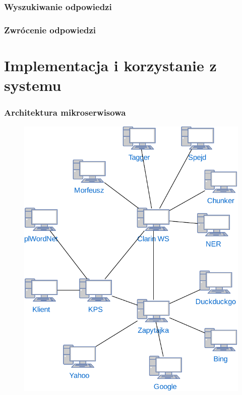 \documentclass{beamer}
\begin{document}
\begin{frame}
  \frametitle{Wyszukiwanie odpowiedzi}

\end{frame}

\begin{frame}
  \frametitle{Zwrócenie odpowiedzi}

\end{frame}

\section{Implementacja i korzystanie z systemu}
\begin{frame}
  \frametitle{Architektura mikroserwisowa}
  \begin{figure}
    \centering
    \includegraphics[width=0.5\columnwidth]{figures/WEDT-Uslugi.pdf}
    \label{fig:klient}
  \end{figure}
\end{frame}
\end{document}
